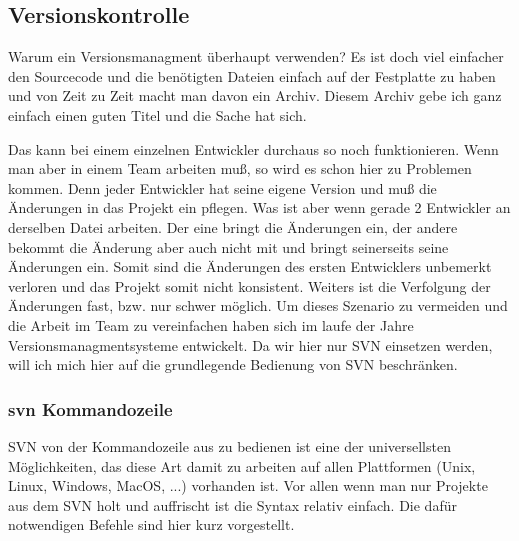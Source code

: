 
\subsection[Versionskontrolle]{Versionskontrolle}
Warum ein Versionsmanagment überhaupt verwenden? Es ist doch viel einfacher den Sourcecode und die benötigten Dateien einfach auf der Festplatte zu haben und von Zeit zu Zeit macht man davon ein Archiv. Diesem Archiv gebe ich ganz einfach einen guten Titel und die Sache hat sich.

Das kann bei einem einzelnen Entwickler durchaus so noch funktionieren. Wenn man aber in einem Team arbeiten muß, so wird es schon hier zu Problemen kommen. Denn jeder Entwickler hat seine eigene Version und muß die Änderungen in das Projekt ein pflegen. Was ist aber wenn gerade 2 Entwickler an derselben Datei arbeiten. Der eine bringt die Änderungen ein, der andere bekommt die Änderung aber auch nicht mit und bringt seinerseits seine Änderungen ein. Somit sind die Änderungen des ersten Entwicklers unbemerkt verloren und das Projekt somit nicht konsistent. Weiters ist die Verfolgung der Änderungen fast, bzw. nur schwer möglich. Um dieses Szenario zu vermeiden und die Arbeit im Team zu vereinfachen haben sich im laufe der Jahre Versionsmanagmentsysteme entwickelt. Da wir hier nur SVN einsetzen werden, will ich mich hier auf die grundlegende Bedienung von SVN beschränken.

\subsubsection[svn Kommandozeile]{svn Kommandozeile}
SVN von der Kommandozeile aus zu bedienen ist eine der universellsten Möglichkeiten, das diese Art damit zu arbeiten auf allen Plattformen (Unix, Linux, Windows, MacOS, ...) vorhanden ist. Vor allen wenn man nur Projekte aus dem SVN holt und auffrischt ist die Syntax relativ einfach. Die dafür notwendigen Befehle sind hier kurz vorgestellt.

